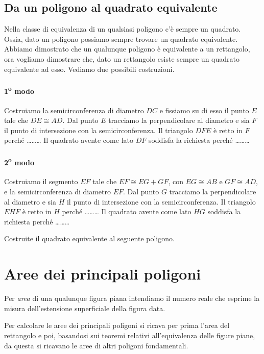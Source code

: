 \subsection{Da un poligono al quadrato equivalente}

Nella classe di equivalenza di un qualsiasi poligono c'è sempre un quadrato. Ossia, dato un poligono possiamo sempre trovare un quadrato equivalente.
Abbiamo dimostrato che un qualunque poligono è equivalente a un rettangolo, ora vogliamo dimostrare che, dato un rettangolo esiste sempre un quadrato equivalente ad esso.
Vediamo due possibili costruzioni.

\paragraph{1\textsuperscript{o} modo}
Costruiamo la semicirconferenza di diametro $DC$ e fissiamo su di esso il punto $E$ tale che $DE\cong AD$. Dal punto $E$ tracciamo la perpendicolare al diametro e sia $F$ il punto di intersezione con la semicirconferenza. Il triangolo $DFE$ è retto in $F$ perché \ldots\ldots\ldots{}
Il quadrato avente come lato $DF$ soddisfa la richiesta perché \ldots\ldots\ldots{}

\paragraph{2\textsuperscript{o} modo}
Costruiamo il segmento $EF$ tale che $EF\cong EG+GF$, con $EG\cong AB$ e $GF\cong AD$, e la semicirconferenza di diametro $EF$. Dal punto $G$ tracciamo la perpendicolare al diametro e sia $H$ il punto di intersezione con la semicirconferenza. Il triangolo $EHF$ è retto in $H$ perché \ldots\ldots\ldots{}
Il quadrato avente come lato $HG$ soddisfa la richiesta perché \ldots\ldots\ldots{}

Costruite il quadrato equivalente al seguente poligono.


\section{Aree dei principali poligoni}

Per \emph{area} di una qualunque figura piana intendiamo il numero reale che esprime la misura dell'estensione superficiale della figura data.

Per calcolare le aree dei principali poligoni si ricava per prima l'area del rettangolo e poi, basandosi sui teoremi relativi all'equivalenza delle figure piane, da questa si ricavano le aree di altri poligoni fondamentali.

